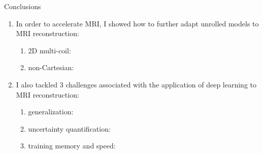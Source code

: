 \documentclass[aspectratio=169,xcolor=dvipsnames]{beamer}
\begin{document}
\begin{frame}{Conclusions}
    \begin{enumerate}[<+->]
        \item In order to accelerate MRI, I showed how to further adapt unrolled models to MRI reconstruction:
        \begin{enumerate}
            \item 2D multi-coil: 
            \item non-Cartesian: 
        \end{enumerate}
        \item I also tackled 3 challenges associated with the application of deep learning to MRI reconstruction:
        \begin{enumerate}
            \item generalization: 
            \item uncertainty quantification: 
            \item training memory and speed: 
        \end{enumerate}
    \end{enumerate}
\end{frame}
\end{document}
